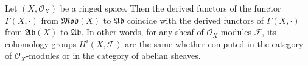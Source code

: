 Let $(X, \mathcal{O}_X)$ be a ringed space. Then the derived functors of the functor $\Gamma(X, \cdot)$ from $\mathfrak{Mod}(X)$ to $\mathfrak{Ab}$ coincide with the derived functors of $\Gamma(X, \cdot)$ from $\mathfrak{Ab}(X)$ to $\mathfrak{Ab}$. In other words, for any sheaf of $\mathcal{O}_X$-modules $\mathcal{F}$, its cohomology groups $H^i(X, \mathcal{F})$ are the same whether computed in the category of $\mathcal{O}_X$-modules or in the category of abelian sheaves.
